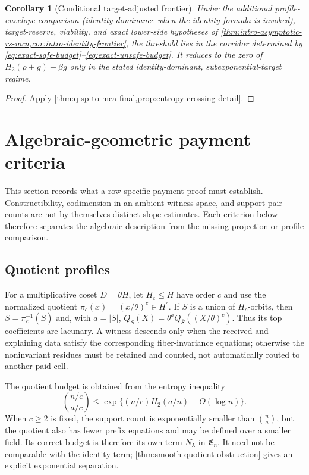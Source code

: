 \documentclass[12pt,a4paper]{amsart}
\numberwithin{equation}{section}
\newtheorem{corollary}[corollary]{Corollary}
\theoremstyle{remark}
\newcommand{\barN}{\overline N}
\newcommand{\Hb}{H_2}
\newcommand{\abs}[1]{\lvert #1\rvert}
\begin{document}
\begin{corollary}[Conditional target-adjusted frontier]\label{cor:frontier-final}
Under the additional profile-envelope comparison (identity-dominance when
the identity formula is invoked), target-reserve, viability, and
exact lower-side hypotheses of
\cref{thm:intro-asymptotic-rs-mca,cor:intro-identity-frontier}, the threshold
lies in the corridor determined by
\eqref{eq:exact-safe-budget}--\eqref{eq:exact-unsafe-budget}.  It reduces to
the zero of \(\Hb(\rho+g)-\beta g\) only in the stated identity-dominant,
subexponential-target regime.
\end{corollary}

\begin{proof}
Apply \cref{thm:q-sp-to-mca-final,prop:entropy-crossing-detail}.
\end{proof}


\section{Algebraic-geometric payment criteria}\label{sec:expanded-ledger-proofs}

This section records what a row-specific payment proof must establish.
Constructibility, codimension in an ambient witness space, and support-pair
counts are not by themselves distinct-slope estimates.  Each criterion
below therefore separates the algebraic description from the missing
projection or profile comparison.

\subsection*{Quotient profiles}
For a multiplicative coset \(D=\theta H\), let \(H_c\le H\) have order
\(c\) and use the normalized quotient
\(\pi_c(x)=(x/\theta)^c\in H^c\).  If \(S\) is a union of \(H_c\)-orbits,
then \(S=\pi_c^{-1}(\bar S)\) and, with \(a=\abs S\),
\(Q_S(X)=\theta^aQ_{\bar S}((X/\theta)^c)\).  Thus its top coefficients
are lacunary.  A witness descends only when the received and explaining
data satisfy the corresponding fiber-invariance equations; otherwise the
noninvariant residues must be retained and counted, not automatically
routed to another paid cell.

The quotient budget is obtained from the entropy inequality
\[
        \binom{n/c}{a/c}\le \exp\{(n/c)\Hb(a/n)+O(\log n)\}.
\]
When \(c\ge2\) is fixed, the support count is exponentially smaller than
\(\binom na\), but the quotient also has fewer prefix equations and may be
defined over a smaller field.  Its correct budget is therefore its own
term \(\barN_\lambda\) in \(\mathfrak E_n\).  It need not be comparable
with the identity term; \cref{thm:smooth-quotient-obstruction} gives an
explicit exponential separation.
\end{document}
